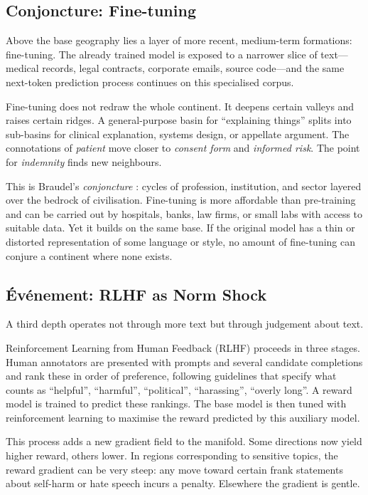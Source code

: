 \documentclass[12pt,a4paper]{article}
\begin{document}
\subsection{Conjoncture: Fine-tuning}

Above the base geography lies a layer of more recent, medium-term formations: fine-tuning. The already trained model is exposed to a narrower slice of text---medical records, legal contracts, corporate emails, source code---and the same next-token prediction process continues on this specialised corpus.

Fine-tuning does not redraw the whole continent. It deepens certain valleys and raises certain ridges. A general-purpose basin for ``explaining things'' splits into sub-basins for clinical explanation, systems design, or appellate argument. The connotations of \emph{patient} move closer to \emph{consent form} and \emph{informed risk}. The point for \emph{indemnity} finds new neighbours.

This is Braudel's \emph{conjoncture} \cite{braudel1980}: cycles of profession, institution, and sector layered over the bedrock of civilisation. Fine-tuning is more affordable than pre-training and can be carried out by hospitals, banks, law firms, or small labs with access to suitable data. Yet it builds on the same base. If the original model has a thin or distorted representation of some language or style, no amount of fine-tuning can conjure a continent where none exists.

\subsection{\'{E}v\'{e}nement: RLHF as Norm Shock}

A third depth operates not through more text but through judgement about text.

Reinforcement Learning from Human Feedback (RLHF) proceeds in three stages. Human annotators are presented with prompts and several candidate completions and rank these in order of preference, following guidelines that specify what counts as ``helpful'', ``harmful'', ``political'', ``harassing'', ``overly long''. A reward model is trained to predict these rankings. The base model is then tuned with reinforcement learning to maximise the reward predicted by this auxiliary model.

This process adds a new gradient field to the manifold. Some directions now yield higher reward, others lower. In regions corresponding to sensitive topics, the reward gradient can be very steep: any move toward certain frank statements about self-harm or hate speech incurs a penalty. Elsewhere the gradient is gentle.
\end{document}
